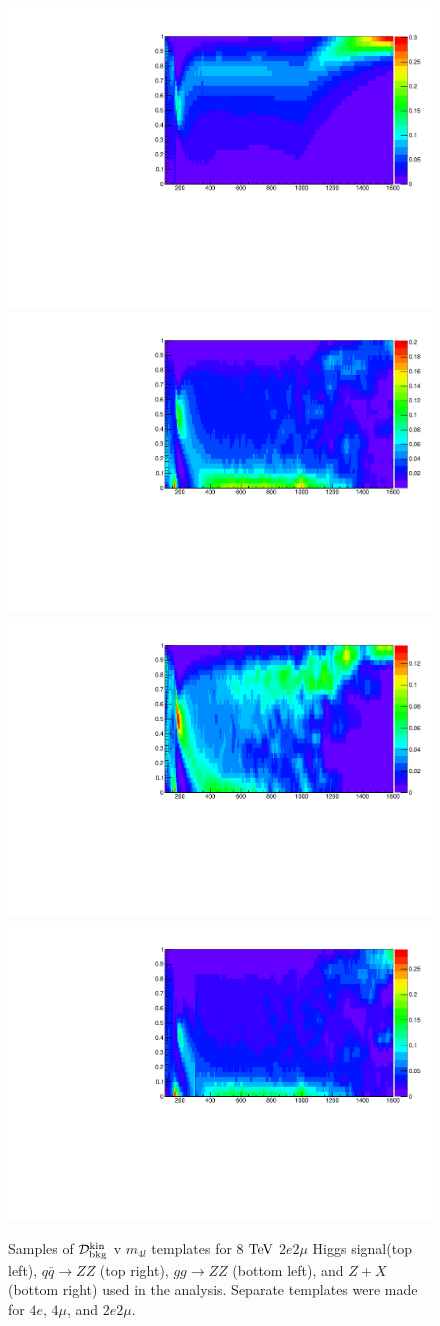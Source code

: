\begin{figure}[htbp]
\begin{center}
\includegraphics[width=.4\linewidth]{HiggsDiscovery/figures/Dsignal_2e2mu.pdf}
\includegraphics[width=.4\linewidth]{HiggsDiscovery/figures/Dbackground_qqZZ_2e2mu.pdf} \\
\includegraphics[width=.4\linewidth]{HiggsDiscovery/figures/Dbackground_ggZZ_2e2mu.pdf}
\includegraphics[width=.4\linewidth]{HiggsDiscovery/figures/Dbackground_ZX_2e2mu.pdf}
\caption[Templates of Kinematic Discriminant for $H \rightarrow ZZ \rightarrow 4l$]{Samples of $\mathcal{D}_{\rm{bkg}}^{\rm{kin}}$ v $m_{4l}$ templates for 8 $\rm{TeV}$ $2e2\mu$ Higgs signal(top left), $q\bar{q}\rightarrow ZZ$ (top right), $gg\rightarrow ZZ$ (bottom left), and $Z+X$ (bottom right) used in the analysis. Separate templates were made for $4e$, $4\mu$, and $2e2\mu$.}
\label{fig:MELATemplates}
\end{center}
\end{figure}

